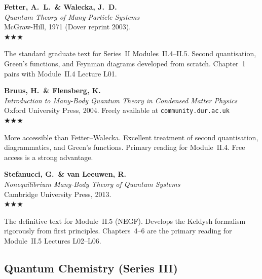 \documentclass[11pt,a4paper]{article}
\newcommand{\essential}{$\bigstar\bigstar\bigstar$}
\newenvironment{bibentry}[1]{%
  \begin{tcolorbox}[entrybox=#1, top=4pt, bottom=4pt]%
}{%
  \end{tcolorbox}\smallskip%
}
\begin{document}
\begin{bibentry}{t4light}
\textbf{Fetter, A.~L.\ \& Walecka, J.~D.}\\
\textit{Quantum Theory of Many-Particle Systems}\\
McGraw-Hill, 1971 (Dover reprint 2003).\\[4pt]
\essential\\[4pt]
\begin{tcolorbox}[annotbox]
The standard graduate text for Series~II Modules~II.4--II.5. Second quantisation,
Green's functions, and Feynman diagrams developed from scratch. Chapter~1 pairs
with Module~II.4 Lecture L01.
\end{tcolorbox}
\end{bibentry}

\begin{bibentry}{t4light}
\textbf{Bruus, H.\ \& Flensberg, K.}\\
\textit{Introduction to Many-Body Quantum Theory in Condensed Matter Physics}\\
Oxford University Press, 2004. Freely available at \texttt{community.dur.ac.uk}\\[4pt]
\essential\\[4pt]
\begin{tcolorbox}[annotbox]
More accessible than Fetter--Walecka. Excellent treatment of second quantisation,
diagrammatics, and Green's functions. Primary reading for Module~II.4.
Free access is a strong advantage.
\end{tcolorbox}
\end{bibentry}

\begin{bibentry}{t4light}
\textbf{Stefanucci, G.\ \& van Leeuwen, R.}\\
\textit{Nonequilibrium Many-Body Theory of Quantum Systems}\\
Cambridge University Press, 2013.\\[4pt]
\essential\\[4pt]
\begin{tcolorbox}[annotbox]
The definitive text for Module~II.5 (NEGF). Develops the Keldysh formalism
rigorously from first principles. Chapters~4--6 are the primary reading for
Module~II.5 Lectures L02--L06.
\end{tcolorbox}
\end{bibentry}

\subsection{Quantum Chemistry (Series III)}
\end{document}
